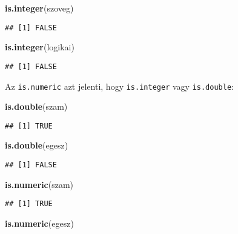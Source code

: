 \documentclass[]{book}
\newenvironment{Shaded}{\begin{snugshade}}{\end{snugshade}}
\newcommand{\KeywordTok}[1]{\textcolor[rgb]{0.13,0.29,0.53}{\textbf{#1}}}
\newcommand{\NormalTok}[1]{#1}
\begin{document}
\begin{Shaded}
\begin{Highlighting}[]
\KeywordTok{is.integer}\NormalTok{(szoveg)}
\end{Highlighting}
\end{Shaded}

\begin{verbatim}
## [1] FALSE
\end{verbatim}

\begin{Shaded}
\begin{Highlighting}[]
\KeywordTok{is.integer}\NormalTok{(logikai)}
\end{Highlighting}
\end{Shaded}

\begin{verbatim}
## [1] FALSE
\end{verbatim}

Az \texttt{is.numeric} azt jelenti, hogy \texttt{is.integer} vagy \texttt{is.double}:

\begin{Shaded}
\begin{Highlighting}[]
\KeywordTok{is.double}\NormalTok{(szam)}
\end{Highlighting}
\end{Shaded}

\begin{verbatim}
## [1] TRUE
\end{verbatim}

\begin{Shaded}
\begin{Highlighting}[]
\KeywordTok{is.double}\NormalTok{(egesz)}
\end{Highlighting}
\end{Shaded}

\begin{verbatim}
## [1] FALSE
\end{verbatim}

\begin{Shaded}
\begin{Highlighting}[]
\KeywordTok{is.numeric}\NormalTok{(szam)}
\end{Highlighting}
\end{Shaded}

\begin{verbatim}
## [1] TRUE
\end{verbatim}

\begin{Shaded}
\begin{Highlighting}[]
\KeywordTok{is.numeric}\NormalTok{(egesz)}
\end{Highlighting}
\end{Shaded}
\end{document}
